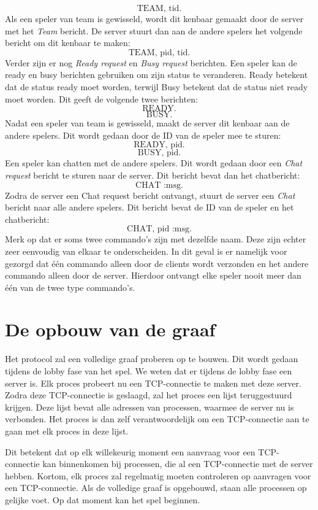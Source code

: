 \documentclass[a4paper,11pt]{article}
\begin{document}
    \[
    \text{TEAM, tid.}
    \]
    Als een speler van team is gewisseld, wordt dit kenbaar gemaakt door de server met het \emph{Team} bericht. De server stuurt dan aan de andere spelers het volgende bericht om dit kenbaar te maken:
    \[
    \text{TEAM, pid, tid.}
    \]
    Verder zijn er nog \emph{Ready request} en \emph{Busy request} berichten. Een speler kan de ready en busy berichten gebruiken om zijn status te veranderen. Ready betekent dat de status ready moet worden, terwijl Busy betekent dat de status niet ready moet worden. Dit geeft de volgende twee berichten:
    \[
    \text{READY.}
    \]
    \[
    \text{BUSY.}
    \]
    Nadat een speler van team is gewisseld, maakt de server dit kenbaar aan de andere spelers. Dit wordt gedaan door de ID van de speler mee te sturen:
    \[
    \text{READY, pid.}
    \]
    \[
    \text{BUSY, pid.}
    \]
    Een speler kan chatten met de andere spelers. Dit wordt gedaan door een \emph{Chat request} bericht te sturen naar de server. Dit bericht bevat dan het chatbericht:
    \[
    \text{CHAT :msg.}
    \]
    Zodra de server een Chat request bericht ontvangt, stuurt de server een \emph{Chat} bericht naar alle andere spelers. Dit bericht bevat de ID van de speler en het chatbericht:
    \[
    \text{CHAT, pid :msg.}
    \]
    Merk op dat er soms twee commando's zijn met dezelfde naam. Deze zijn echter zeer eenvoudig van elkaar te onderscheiden. In dit geval is er namelijk voor gezorgd dat \'e\'en commando alleen door de clients wordt verzonden en het andere commando alleen door de server. Hierdoor ontvangt elke speler nooit meer dan \'e\'en van de twee type commando's.
    
    
    \section{De opbouw van de graaf}
    Het protocol zal een volledige graaf proberen op te bouwen. Dit wordt gedaan tijdens de lobby fase van het spel. We weten dat er tijdens de lobby fase een server is. Elk proces probeert nu een TCP-connectie te maken met deze server. Zodra deze TCP-connectie is geslaagd, zal het proces een lijst teruggestuurd krijgen. Deze lijst bevat alle adressen van processen, waarmee de server nu is verbonden. Het proces is dan zelf verantwoordelijk om een TCP-connectie aan te gaan met elk proces in deze lijst.
    
    Dit betekent dat op elk willekeurig moment een aanvraag voor een TCP-connectie kan binnenkomen bij processen, die al een TCP-connectie met de server hebben. Kortom, elk proces zal regelmatig moeten controleren op aanvragen voor een TCP-connectie. Als de volledige graaf is opgebouwd, staan alle processen op gelijke voet. Op dat moment kan het spel beginnen.
    
\end{document}
